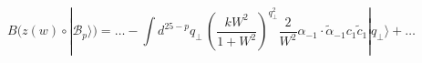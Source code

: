 \begin{equation}
  B(z(w) \circ |\mathcal{B}_p\rangle) = \ldots - 
  \int d^{25-p}q_{\bot}\,
\left(\frac{k W^2}{1+W^2}\right)^{q_{\bot}^2} \frac{2}{W^2}
   \alpha_{-1} \cdot\tilde{\alpha}_{-1} c_{1}\tilde{c}_{1} |q_{\bot}\rangle
+ \ldots
\end{equation}

